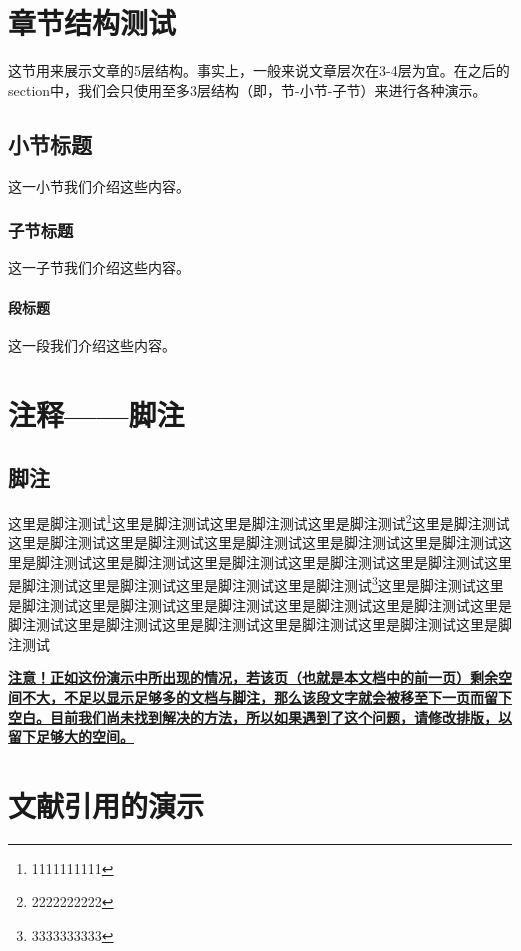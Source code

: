 \section{章节结构测试}这节用来展示文章的5层结构。事实上，一般来说文章层次在3-4层为宜。在之后的section中，我们会只使用至多3层结构（即，节-小节-子节）来进行各种演示。
 

\subsection{小节标题}这一小节我们介绍这些内容。


\subsubsection{子节标题}这一子节我们介绍这些内容。


\paragraph{段标题}这一段我们介绍这些内容。

\section{注释——脚注}
\subsection{脚注}
\par 这里是脚注测试\footnote{1111111111}这里是脚注测试这里是脚注测试这里是脚注测试\footnote{2222222222}这里是脚注测试这里是脚注测试这里是脚注测试这里是脚注测试这里是脚注测试这里是脚注测试这里是脚注测试这里是脚注测试这里是脚注测试这里是脚注测试这里是脚注测试这里是脚注测试这里是脚注测试这里是脚注测试这里是脚注测试\footnote{3333333333}这里是脚注测试这里是脚注测试这里是脚注测试这里是脚注测试这里是脚注测试这里是脚注测试这里是脚注测试这里是脚注测试这里是脚注测试这里是脚注测试这里是脚注测试这里是脚注测试

\textbf{\uline{注意！正如这份演示中所出现的情况，若该页（也就是本文档中的前一页）剩余空间不大，不足以显示足够多的文档与脚注，那么该段文字就会被移至下一页而留下空白。目前我们尚未找到解决的方法，所以如果遇到了这个问题，请修改排版，以留下足够大的空间。}}



\section{文献引用的演示}

